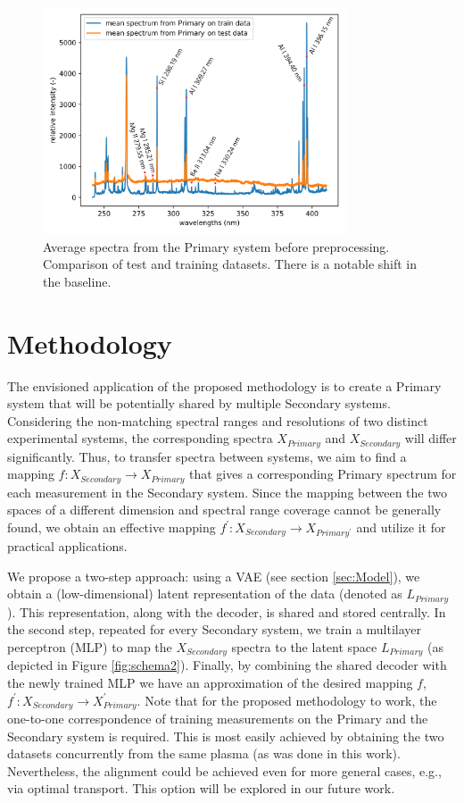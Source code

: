 \documentclass[preprint,11pt]{elsarticle}
\begin{document}
\begin{figure}[!htb]
    \centering
    \includegraphics[width=0.8\textwidth]{train_vs_test_mean.png}
    \caption{Average spectra from the Primary system before preprocessing. Comparison of test and training datasets. There is a notable shift in the baseline.}
    \label{fig:shift}
\end{figure}



\section{Methodology}
\label{sec:Met}
\noindent
The envisioned application of the proposed methodology is to create a Primary system that will be potentially shared by multiple Secondary systems. Considering the non-matching spectral ranges and resolutions of two distinct experimental systems, the corresponding spectra $X_{Primary}$ and $X_{Secondary}$ will differ significantly. Thus, to transfer spectra between systems, we aim to find a mapping $f: X_{Secondary} \rightarrow X_{Primary}$ that gives a corresponding Primary spectrum for each measurement in the Secondary system. Since the mapping between the two spaces of a different dimension and spectral range coverage cannot be generally found, we obtain an effective mapping $f^{\prime}: X_{Secondary} \rightarrow X_{Primary^{\prime}}$ and utilize it for practical applications.

We propose a two-step approach: using a VAE (see section \ref{sec:Model}), we obtain a (low-dimensional) latent representation of the data (denoted as $L_{Primary}$). This representation, along with the decoder, is shared and stored centrally. In the second step, repeated for every Secondary system, we train a multilayer perceptron (MLP) to map the $X_{Secondary}$ spectra to the latent space $L_{Primary}$ (as depicted in Figure \ref{fig:schema2}). Finally, by combining the shared decoder with the newly trained MLP we have an approximation of the desired mapping $f$, $f^{\prime}: X_{Secondary} \rightarrow X_{Primary}^{\prime}$. Note that for the proposed methodology to work, the one-to-one correspondence of training measurements on the Primary and the Secondary system is required. This is most easily achieved by obtaining the two datasets concurrently from the same plasma (as was done in this work). Nevertheless, the alignment could be achieved even for more general cases, e.g., via optimal transport. This option will be explored in our future work.
\end{document}
